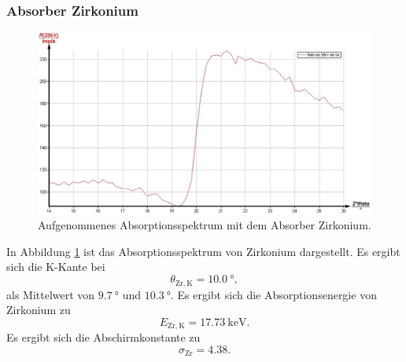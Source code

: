 \subsubsection{Absorber Zirkonium}
\begin{figure}
	\centering
	\includegraphics[width=1.0\textwidth]{nIKO_und_jULIAN_ÜLADS/zirkonium.jpg}
	\caption{Aufgenommenes Absorptionsspektrum mit dem Absorber Zirkonium.}
	\label{fig:zirkonium_absorber}
\end{figure}
In Abbildung \ref{fig:zirkonium_absorber} ist das Absorptionsspektrum von Zirkonium
dargestellt.
Es ergibt sich die K-Kante bei
\begin{equation*}
	\theta_{\mathrm{Zr,K}} = \SI{10,0}{\degree} \mathrm{,}
\end{equation*}
als Mittelwert von $\SI{9,7}{\degree}$ und $\SI{10,3}{\degree}$.
Es ergibt sich die Absorptionsenergie von Zirkonium zu
\begin{equation*}
	E_{\mathrm{Zr,K}} = \SI{17,73}{\kilo\electronvolt} \mathrm{.}
\end{equation*}
Es ergibt sich die Abschirmkonstante zu
\begin{equation*}
	\sigma_{\mathrm{Zr}} = \num{4,38} \mathrm{.}
\end{equation*}

\FloatBarrier
